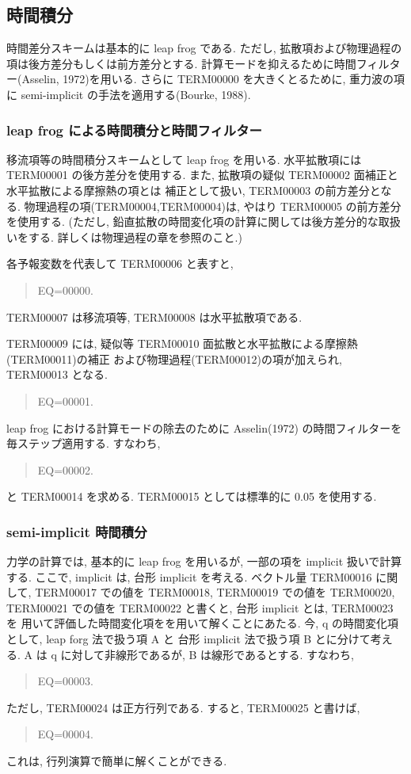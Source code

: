 ﻿\subsection{時間積分}

時間差分スキームは基本的に leap frog である.
ただし, 拡散項および物理過程の項は後方差分もしくは前方差分とする.
計算モードを抑えるために時間フィルター(Asselin, 1972)を用いる.
さらに TERM00000 を大きくとるために,
重力波の項に semi-implicit の手法を適用する(Bourke, 1988).

\subsubsection{leap frog による時間積分と時間フィルター}

移流項等の時間積分スキームとして leap frog を用いる.
水平拡散項には TERM00001 の後方差分を使用する.
また, 拡散項の疑似 TERM00002 面補正と水平拡散による摩擦熱の項とは
補正として扱い, TERM00003 の前方差分となる.
物理過程の項(TERM00004,TERM00004)は,
やはり TERM00005 の前方差分を使用する.
(ただし, 鉛直拡散の時間変化項の計算に関しては後方差分的な取扱いをする.
詳しくは物理過程の章を参照のこと.)

各予報変数を代表して TERM00006 と表すと,
%
\begin{quote}
EQ=00000.
\end{quote}
%
TERM00007 は移流項等,
TERM00008 は水平拡散項である.

TERM00009 には, 
疑似等 TERM00010 面拡散と水平拡散による摩擦熱(TERM00011)の補正
および物理過程(TERM00012)の項が加えられ,
TERM00013 となる.
%
\begin{quote}
EQ=00001.
\end{quote}

leap frog における計算モードの除去のために 
Asselin(1972) の時間フィルターを毎ステップ適用する.
すなわち, 
%
\begin{quote}
EQ=00002.
\end{quote}
%
と TERM00014 を求める.
TERM00015 としては標準的に 0.05 を使用する. 

\subsubsection{semi-implicit 時間積分}

力学の計算では, 基本的に leap frog を用いるが,
一部の項を implicit 扱いで計算する.
ここで, implicit は, 台形 implicit を考える.
ベクトル量 TERM00016 に関して,
TERM00017 での値を TERM00018,
TERM00019 での値を TERM00020,
TERM00021 での値を TERM00022 と書くと,
台形 implicit とは,
TERM00023 を
用いて評価した時間変化項をを用いて解くことにあたる.
%
今, {\boldmath q} の時間変化項として,
leap forg 法で扱う項 A と 台形 implicit 法で扱う項 B とに分けて考える.
A は {\boldmath q} に対して非線形であるが, B は線形であるとする.
すなわち,
%
\begin{quote}
EQ=00003.
\end{quote}
%
ただし, TERM00024 は正方行列である. すると,
TERM00025
と書けば,
\begin{quote}
EQ=00004.
\end{quote}
%
これは, 行列演算で簡単に解くことができる.

